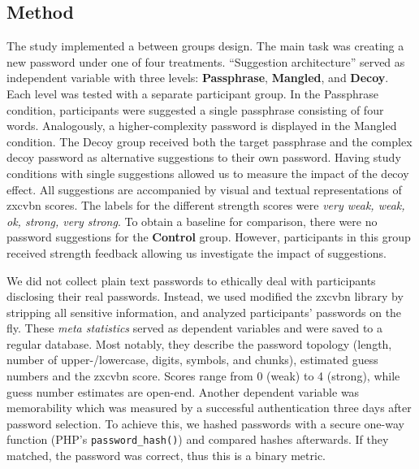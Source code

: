 \subsection{Method}
The study implemented a between groups design. The main task was creating a new password under one of four treatments. ``Suggestion architecture'' served as independent variable with three levels: \textbf{Passphrase}, \textbf{Mangled}, and \textbf{Decoy}. Each level was tested with a separate participant group. In the Passphrase condition, participants were suggested a single passphrase consisting of four words. Analogously, a higher-complexity password is displayed in the Mangled condition. The Decoy group received both the target passphrase and the complex decoy password as alternative suggestions to their own password. Having study conditions with single suggestions allowed us to measure the impact of the decoy effect. All suggestions are accompanied by visual and textual representations of zxcvbn scores. The labels for the different strength scores were \textit{very weak, weak, ok, strong, very strong}. To obtain a baseline for comparison, there were no password suggestions for the \textbf{Control} group. However, participants in this group received strength feedback allowing us investigate the impact of suggestions. 

We did not collect plain text passwords to ethically deal with participants disclosing their real passwords. Instead, we used modified the zxcvbn library by stripping all sensitive information, and analyzed participants' passwords on the fly. These \textit{meta statistics} served as dependent variables and were saved to a regular database. Most notably, they describe the password topology (length, number of upper-/lowercase, digits, symbols, and chunks), estimated guess numbers and the zxcvbn score. Scores range from 0 (weak) to 4 (strong), while guess number estimates are open-end. Another dependent variable was memorability which was measured by a successful authentication three days after password selection. To achieve this, we hashed passwords with a secure one-way function (PHP's \texttt{password\_hash()}) and compared hashes afterwards. If they matched, the password was correct, thus this is a binary metric.

